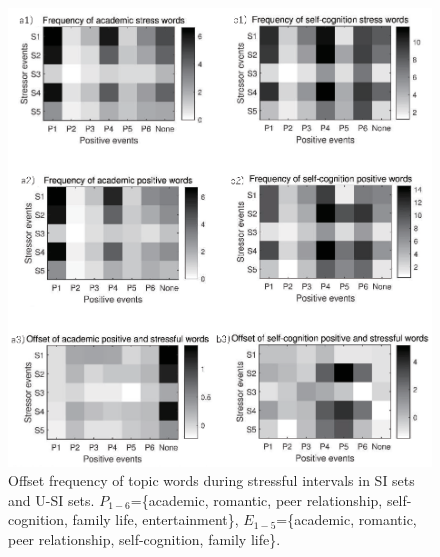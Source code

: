  \begin{figure}[h]
\centering
\includegraphics[width=\linewidth]{figs/gray/topicOffset.eps}
\caption{\small{Offset frequency of topic words during stressful intervals in SI sets and U-SI sets.
$P_{1-6}$=\{academic, romantic, peer relationship, self-cognition, family life, entertainment\},
$E_{1-5}$=\{academic, romantic, peer relationship, self-cognition, family life\}.}}
\label{fig:stopic}
\end{figure}

